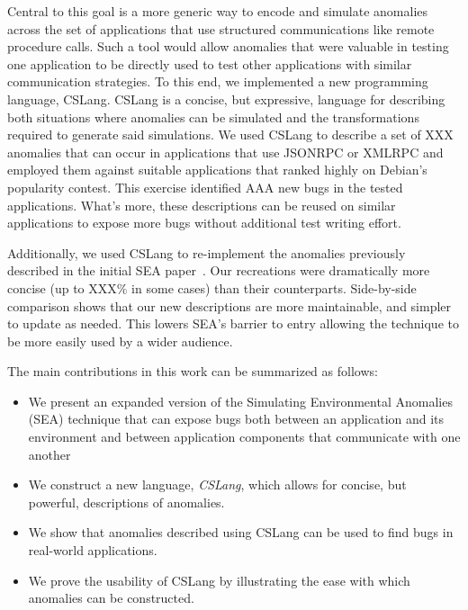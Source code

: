 Central to this goal is
a more generic way to
encode and simulate anomalies across the set of applications that use
structured communications like remote procedure calls.
Such a tool would allow
anomalies that were
valuable in testing one application to be directly used to test other
applications with similar communication strategies.
To this end,
we implemented a new programming language,
CSLang.
CSLang is a concise, but
expressive,
language
for describing both situations
where anomalies can be simulated
and the transformations required
to generate said simulations.
We used CSLang to describe a set of XXX anomalies that can occur in
applications that use JSONRPC or XMLRPC and employed them against
suitable
applications that ranked highly on Debian's popularity contest.  This
exercise identified AAA new bugs in the tested applications.
What's more, these descriptions can be reused on
similar applications to expose more
bugs without additional test writing effort.

Additionally, we used CSLang to re-implement the
anomalies previously described in the initial SEA paper~\cite{crashsim}.
Our recreations were dramatically more concise (up to XXX\% in some cases)
than their counterparts.  Side-by-side comparison shows that our new
descriptions are
more maintainable,
and simpler to update as needed.
This lowers SEA's barrier to entry allowing the
technique to be more easily used by a wider audience.


The main contributions in this work can be summarized as follows:

\begin{itemize}

\item{We present an expanded version of the Simulating Environmental
  Anomalies (SEA) technique that can expose bugs both between an
    application and its environment and between application components that
    communicate with one another}

\item{We construct a new language, {\em CSLang},
  which allows for concise, but powerful, descriptions of anomalies.}

\item{We show that anomalies described using CSLang can be used to find bugs
  in real-world applications.}

\item{We prove the usability of CSLang by illustrating the ease with which
  anomalies can be constructed.}

\end{itemize}

